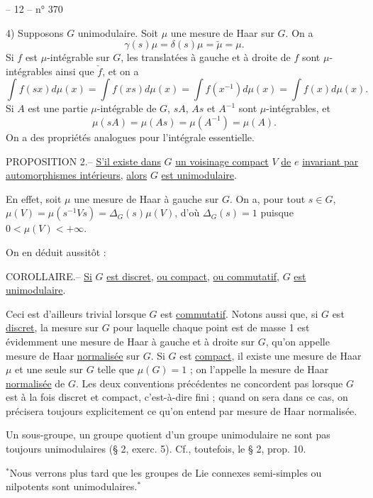 -- 12 -- \hfill n° 370

4) Supposons $G$ unimodulaire. Soit $\mu$ une mesure de Haar sur $G$. On a
\[
\tag{26} \gamma(s)\mu=\delta(s)\mu=\check\mu=\mu.
\]
Si $f$ est $\mu$-intégrable sur $G$, les translatées à gauche et à droite de $f$ sont
$\mu$-intégrables ainsi que $\check f$, et on a
\[
\tag{27} \int f(sx)d\mu(x)=\int f(xs)d\mu(x)=\int f(x^{-1})d\mu(x)=\int f(x)d\mu(x).
\]
Si $A$ est une partie $\mu$-intégrable de $G$, $sA$, $As$ et $A^{-1}$ sont $\mu$-intégrables, et
\[
\tag{28} \mu(sA)=\mu(As)=\mu(A^{-1})=\mu(A).
\]
On a des propriétés analogues pour l'intégrale essentielle.

PROPOSITION 2.-- \uline{S'il existe dans} $G$ \uline{un voisinage compact} $V$ \uline{de} $e$ \uline{invariant par
automorphismes intérieurs}, \uline{alors} $G$ \uline{est unimodulaire}.

En effet, soit $\mu$ une mesure de Haar à gauche sur $G$. On a, pour tout $s\in G$,
$\mu(V)=\mu(s^{-1}Vs)=\Delta_G(s)\mu(V)$, d'où $\Delta_G(s)=1$ puisque $0<\mu(V)<+\infty$.

On en déduit aussitôt :

COROLLAIRE.-- \uline{Si} $G$ \uline{est discret}, \uline{ou compact}, \uline{ou commutatif}, $G$ \uline{est unimodulaire}.

Ceci est d'ailleurs trivial lorsque $G$ est \uline{commutatif}. Notons aussi que, si
$G$ est \uline{discret}, la mesure sur $G$ pour laquelle chaque point est de masse 1 est
évidemment une mesure de Haar à gauche et à droite sur $G$, qu'on appelle mesure
de Haar \uline{normalisée} sur $G$. Si $G$ est \uline{compact}, il existe une mesure de Haar $\mu$ et
une seule sur $G$ telle que $\mu(G)=1$ ; on l'appelle la mesure de Haar \uline{normalisée}
de $G$. Les deux conventions précédentes ne concordent pas lorsque $G$ est à la
fois discret et compact, c'est-à-dire fini ; quand on sera dans ce cas, on
précisera toujours explicitement ce qu'on entend par mesure de Haar normalisée.

Un sous-groupe, un groupe quotient d'un groupe unimodulaire ne sont pas
toujours unimodulaires (§ 2, exerc. 5). Cf., toutefois, le § 2, prop. 10.

$^{*}$Nous verrons plus tard que les groupes de Lie connexes semi-simples ou
nilpotents sont unimodulaires.$^{*}$
